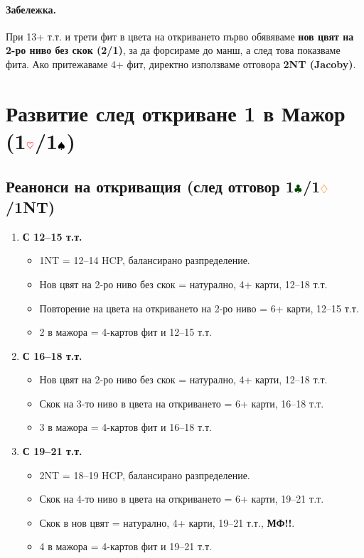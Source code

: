 \documentclass[10pt,a5paper]{extarticle}
\newcommand{\Rheart}{\textcolor{red}{\heartsuit}}
\newcommand{\Rdiamond}{\textcolor{orange}{\diamondsuit}}
\newcommand{\Bspade}{\textcolor{black}{\spadesuit}}
\newcommand{\Bclub}{\textcolor{darkgreen}{\clubsuit}}
\begin{document}
\paragraph{Забележка.}  
При 13+ т.т. и трети фит в цвета на откриването първо обявяваме \textbf{нов цвят на 2-ро ниво без скок (2/1)}, за да форсираме до манш, а след това показваме фита.  
Ако притежаваме 4+ фит, директно използваме отговора \textbf{2NT (Jacoby)}.
\newpage
\section{Развитие след откриване 1 в Мажор (1$\Rheart$/1$\Bspade$)}

\subsection*{Реанонси на откриващия (след отговор 1$\Bclub$/1$\Rdiamond$/1NT)}

\begin{enumerate}
  \item[] \textbf{С 12–15 т.т.}
  \begin{itemize}
    \item[] 1NT = 12–14 HCP, балансирано разпределение.
    \item[] Нов цвят на 2-ро ниво без скок = натурално, 4+ карти, 12–18 т.т.
    \item[] Повторение на цвета на откриването на 2-ро ниво = 6+ карти, 12–15 т.т.
    \item[] 2 в мажора = 4-картов фит и 12–15 т.т.
  \end{itemize}

  \item[] \textbf{С 16–18 т.т.}
  \begin{itemize}
    \item[] Нов цвят на 2-ро ниво без скок = натурално, 4+ карти, 12–18 т.т.
    \item[] Скок на 3-то ниво в цвета на откриването = 6+ карти, 16–18 т.т.
    \item[] 3 в мажора = 4-картов фит и 16–18 т.т.
  \end{itemize}

  \item[] \textbf{С 19–21 т.т.}
  \begin{itemize}
    \item[] 2NT = 18–19 HCP, балансирано разпределение.
    \item[] Скок на 4-то ниво в цвета на откриването = 6+ карти, 19–21 т.т.
    \item[] Скок в нов цвят = натурално, 4+ карти, 19–21 т.т., \textbf{МФ!!}.
    \item[] 4 в мажора = 4-картов фит и 19–21 т.т.
  \end{itemize}
\end{enumerate}
\end{document}
